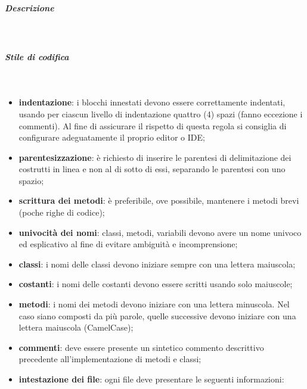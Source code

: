 			\subparagraph*{Descrizione} \mbox{}\\
			
			 \newline 
			
			\subparagraph*{Stile di codifica} \mbox{}\\
			
				\begin{itemize}
					\item \textbf{indentazione}: i blocchi innestati devono essere correttamente 
						indentati, usando per ciascun livello di indentazione quattro (4) spazi (fanno 
						eccezione i commenti). Al fine di assicurare il rispetto di questa regola si 
						consiglia di configurare adeguatamente il proprio editor o IDE;
					\item \textbf{parentesizzazione}: è richiesto di inserire 
					le parentesi di delimitazione dei costrutti in linea e non 
					al di sotto di essi, separando le parentesi con uno spazio;
					\item \textbf{scrittura dei metodi}: è preferibile, ove possibile, 
						mantenere i metodi brevi (poche righe di codice);
					\item \textbf{univocità dei nomi}: classi, metodi, variabili devono avere un 
						nome univoco	ed esplicativo al fine di evitare ambiguità e incomprensione;
					\item \textbf{classi}: i nomi delle classi devono iniziare sempre con una 
						lettera maiuscola;		
					\item \textbf{costanti}: i nomi delle costanti devono essere scritti usando 
						solo maiuscole;
					\item \textbf{metodi}: i nomi dei metodi devono iniziare con una lettera 
						minuscola. Nel caso siano composti da più parole, quelle successive devono iniziare con una 
						lettera maiuscola (CamelCase\glo{});
					\item \textbf{commenti}: deve essere presente un sintetico commento descrittivo precedente all'implementazione di metodi e classi;
					\item \textbf{intestazione dei file}: ogni file deve presentare le seguenti informazioni:

\end{itemize}

